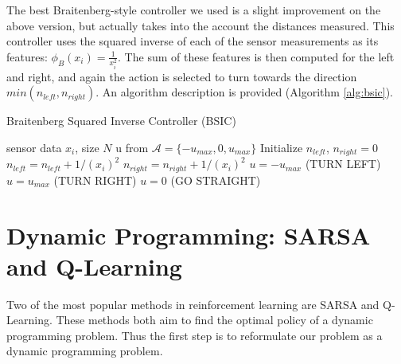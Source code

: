 \documentclass{article}
\begin{document}
The best Braitenberg-style controller we used is a slight improvement on the above version, but actually takes into the account the distances measured.  This controller uses the squared inverse of each of the sensor measurements as its features: $\phi_{B} (x_i) = \frac{1}{x_i^2}$.  The sum of these features is then computed for the left and right, and again the action is selected to turn towards the direction $min(n_{left}, n_{right})$.  An algorithm description is provided (Algorithm \ref{alg:bsic}).
%
\begin{algorithm}[]
   \caption{Braitenberg Squared Inverse Controller (BSIC)}
   \label{alg:bsic}
\begin{algorithmic}
    sensor data $x_i$, size $N$
    u from $\mathcal{A} =  \{-u_{max}, 0, u_{max}\}$
   \STATE Initialize $n_{left}$, $n_{right} = 0$
   \STATE $n_{left} = n_{left} + 1/(x_i)^2$
   \ENDFOR
   \STATE $n_{right} = n_{right} + 1/(x_i)^2$
   \ENDFOR
   \STATE $u = -u_{max}$ (TURN LEFT)
   \ELSE 
   \STATE $u = u_{max}$ (TURN RIGHT)
   \ELSE 
   \STATE $u=0$ (GO STRAIGHT)
   \ENDIF
   \ENDIF

\end{algorithmic}
\end{algorithm}



\section{Dynamic Programming: SARSA and Q-Learning}
Two of the most popular methods in reinforcement learning are SARSA and Q-Learning. These methods both aim to find the optimal policy of a dynamic programming problem. Thus the first step is to reformulate our problem as a dynamic programming problem. 
\end{document}
